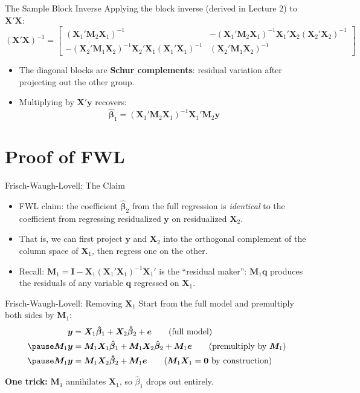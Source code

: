 \documentclass[aspectratio=169, handout, t]{beamer}
\numberwithin{equation}{section}
\begin{document}
\begin{frame}{The Sample Block Inverse}
Applying the block inverse (derived in Lecture 2) to $\bm{X}'\bm{X}$:\pause
$$(\bm{X}'\bm{X})^{-1}=\begin{bmatrix}
  (\bm{X}_1'\bm{M}_2\bm{X}_1)^{-1}
  & -(\bm{X}_1'\bm{M}_2\bm{X}_1)^{-1}\bm{X}_1'\bm{X}_2(\bm{X}_2'\bm{X}_2)^{-1}\\[6pt]
  -(\bm{X}_2'\bm{M}_1\bm{X}_2)^{-1}\bm{X}_2'\bm{X}_1(\bm{X}_1'\bm{X}_1)^{-1}
  & (\bm{X}_2'\bm{M}_1\bm{X}_2)^{-1}
\end{bmatrix}$$\pause
\begin{itemize}
\item The diagonal blocks are \textbf{Schur complements}: residual variation after projecting out the other group.\pause
\item Multiplying by $\bm{X}'\bm{y}$ recovers:
$$\hat{\bm{\beta}}_1=(\bm{X}_1'\bm{M}_2\bm{X}_1)^{-1}\bm{X}_1'\bm{M}_2\bm{y}$$
\end{itemize}
\end{frame}



\section{Proof of FWL}
\setcounter{subsection}{1}
\begin{frame}{Frisch-Waugh-Lovell: The Claim}
\begin{itemize}
\item FWL claim: the coefficient $\bm{\hat{\beta}}_2$ from the full regression is \emph{identical} to the coefficient from regressing residualized $\bm{y}$ on residualized $\bm{X}_2$.\pause
\item That is, we can first project $\bm{y}$ and $\bm{X}_2$ into the orthogonal complement of the column space of $\bm{X}_1$, then regress one on the other.\pause
\item Recall: $\bm{M}_1 = \bm{I} - \bm{X}_1(\bm{X}_1'\bm{X}_1)^{-1}\bm{X}_1'$ is the ``residual maker'': $\bm{M}_1\bm{q}$ produces the residuals of any variable $\bm{q}$ regressed on $\bm{X}_1$.
\end{itemize}
\end{frame}

\begin{frame}{Frisch-Waugh-Lovell: Removing $\bm{X}_1$}
Start from the full model and premultiply both sides by $\bm{M}_1$:
\begin{align*}
\bm{y}&=\bm{X}_1 \bm{\hat{\beta}}_1+\bm{X}_2 \bm{\hat{\beta}}_2+\bm{e} \tag{full model}\\\pause
\bm{M}_1\bm{y}&=\bm{M}_1\bm{X}_1 \bm{\hat{\beta}}_1+\bm{M}_1 \bm{X}_2 \bm{\hat{\beta}}_2+\bm{M}_1\bm{e} \tag{premultiply by $\bm{M}_1$}\\\pause
\bm{M}_1\bm{y}&=\bm{M}_1 \bm{X}_2 \bm{\hat{\beta}}_2+\bm{M}_1\bm{e} \tag{$\bm{M}_1\bm{X}_1=\bm{0}$ by construction}
\end{align*}\pause
\begin{tcolorbox}[colback=blue!5, colframe=blue!50, boxsep=2pt, top=2pt, bottom=2pt]
\textbf{One trick:} $\bm{M}_1$ annihilates $\bm{X}_1$, so $\hat{\beta}_1$ drops out entirely.
\end{tcolorbox}
\end{frame}
\end{document}
